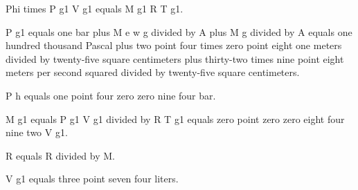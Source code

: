 Phi times P g1 V g1 equals M g1 R T g1.

P g1 equals one bar plus M e w g divided by A plus M g divided by A equals one hundred thousand Pascal plus two point four times zero point eight one meters divided by twenty-five square centimeters plus thirty-two times nine point eight meters per second squared divided by twenty-five square centimeters.

P h equals one point four zero zero nine four bar.

M g1 equals P g1 V g1 divided by R T g1 equals zero point zero zero eight four nine two V g1.

R equals R divided by M.

V g1 equals three point seven four liters.